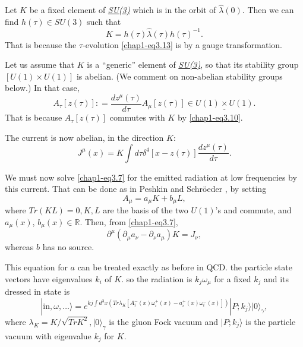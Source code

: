 Let $K$ be a fixed element of \ul{\textit{SU(3)}} which is in the orbit of $\hat{\lambda}(0)$. Then we can find $h (\tau) \in SU(3)$ such that
\begin{equation}
  K= h (\tau) \hat{\lambda} (\tau) h(\tau)^{-1}.\label{chap1-eq3.14}
\end{equation}
That is because the $\tau$-evolution \eqref{chap1-eq3.13} is by a gauge transformation.

Let us assume that $K$ is a ``generic'' element of \ul{\textit{SU(3)}}, so that its stability group $[U(1) \times U (1)]$ is abelian. (We comment on non-abelian stability groups below.) In that case,
\begin{equation}
A_\tau [z(\tau)]: = \frac{dz^\mu(\tau)}{d\tau} A_\mu [z(\tau)] \in \underline{U(1) \times U(1)}.\label{chap1-eq3.15}
\end{equation}
That is because $A_\tau [z(\tau)]$ commutes with $K$ by \eqref{chap1-eq3.10}.

The current is now abelian, in the direction $K$:
\begin{equation}
J^\mu (x) = K \int d \tau \delta^4 [x-z(\tau)] \frac{dz^\mu(\tau)}{d\tau}. \label{chap1-eq3.16}
\end{equation}

We must now solve \eqref{chap1-eq3.7} for the emitted radiation at low frequencies by this current. That can be done as in Peshkin and Schr\"oeder \cite{key8}, by setting
\begin{equation}
A_\mu = a_\mu K + b_\mu L, \label{chap1-eq3.17}
\end{equation}
where $Tr (KL)=0, K, L$ are the basis of the two \ul{$U(1)$}'s and commute, and $a_\mu(x)$, $b_\mu(x)\in \mathbb{R}$. Then, from \eqref{chap1-eq3.7},
\begin{equation}
\partial^\mu (\partial_\mu a_{\nu} - \partial_\nu a_\mu) K = J_{\nu}, \label{chap1-eq3.18}
\end{equation}
whereas $b$ has no source.

This equation for $a$ can be treated exactly as before in QCD. the particle state vectors have eigenvalues $k_i$ of $K$. so the radiation is $k_j \omega_\mu$ for a fixed $k_j$ and its dressed in state is
\begin{equation}
|\text{in}, \omega, \ldots \rangle = e^{kj \int d^3 x (Tr\lambda_K[A_i^- (x) \omega_i^+ (x)- a_i^+ (x) \omega_i^-(x)])} | P; k_j \rangle |0\rangle_\gamma, \label{chap1-eq3.19} 
\end{equation}
where $\lambda_K = K / \sqrt{TrK^2}, |0\rangle_\gamma$ is the gluon Fock vacuum and $|P; k_j \rangle$ is the particle vacuum with eigenvalue $k_j$ for $K$.


